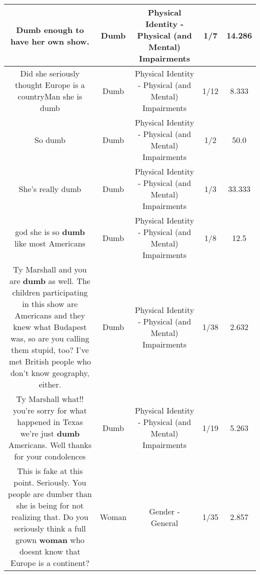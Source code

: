 \documentclass[11pt]{article}
\newlength\mylength
\begin{document}
\begin{center}
\begin{longtable}{|C{.65\mylength}|C{.30\mylength}|C{.12\mylength}|C{.12\mylength}|C{.12\mylength}|}
  \small Dumb enough to have her own show.\normalsize   & Dumb & Physical Identity - Physical (and Mental) Impairments & 1/7 & 14.286 \\  \hline
  \small Did she seriously thought Europe is a countryMan she is dumb\normalsize   & Dumb & Physical Identity - Physical (and Mental) Impairments & 1/12 & 8.333 \\  \hline
  \small So dumb\normalsize   & Dumb & Physical Identity - Physical (and Mental) Impairments & 1/2 & 50.0 \\  \hline
  \small She's really dumb\normalsize   & Dumb & Physical Identity - Physical (and Mental) Impairments & 1/3 & 33.333 \\  \hline
  \small god she is so \textbf{dumb} like most Americans\normalsize   & Dumb & Physical Identity - Physical (and Mental) Impairments & 1/8 & 12.5 \\  \hline
  \small Ty Marshall and you are \textbf{dumb} as well. The children participating in this show are Americans and they knew what Budapest was, so are you calling them stupid, too? I've met British people who don't know geography, either.\normalsize   & Dumb & Physical Identity - Physical (and Mental) Impairments & 1/38 & 2.632 \\  \hline
  \small Ty Marshall  what!! you're sorry for what happened in Texas we're just \textbf{dumb} Americans. Well thanks for your condolences\normalsize   & Dumb & Physical Identity - Physical (and Mental) Impairments & 1/19 & 5.263 \\  \hline
  \small This is fake at this point. Seriously. You people are dumber than she is being for not realizing that. Do you seriously think a full grown \textbf{woman} who doesnt know that Europe is a continent?\normalsize   & Woman & Gender - General & 1/35 & 2.857 \\  \hline

\end{longtable}
\end{center}
\end{document}

